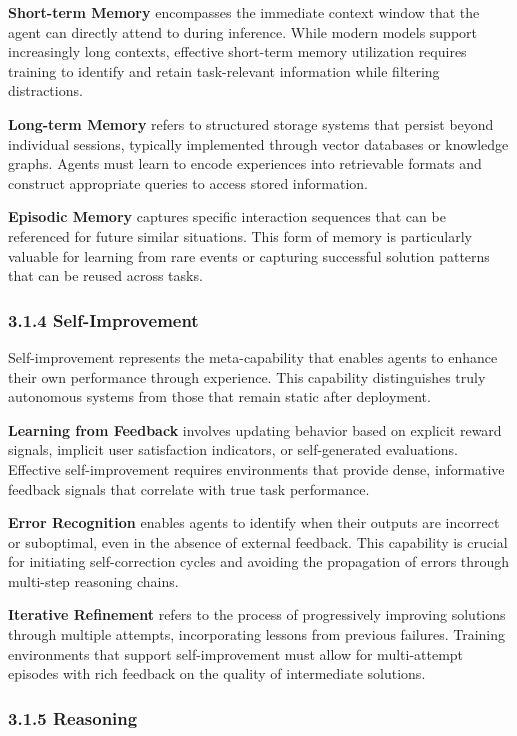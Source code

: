 \textbf{Short-term Memory} encompasses the immediate context window that the agent can directly attend to during inference. While modern models support increasingly long contexts, effective short-term memory utilization requires training to identify and retain task-relevant information while filtering distractions.

\textbf{Long-term Memory} refers to structured storage systems that persist beyond individual sessions, typically implemented through vector databases or knowledge graphs. Agents must learn to encode experiences into retrievable formats and construct appropriate queries to access stored information.

\textbf{Episodic Memory} captures specific interaction sequences that can be referenced for future similar situations. This form of memory is particularly valuable for learning from rare events or capturing successful solution patterns that can be reused across tasks.

\subsubsection{3.1.4 Self-Improvement}

Self-improvement represents the meta-capability that enables agents to enhance their own performance through experience. This capability distinguishes truly autonomous systems from those that remain static after deployment.

\textbf{Learning from Feedback} involves updating behavior based on explicit reward signals, implicit user satisfaction indicators, or self-generated evaluations. Effective self-improvement requires environments that provide dense, informative feedback signals that correlate with true task performance.

\textbf{Error Recognition} enables agents to identify when their outputs are incorrect or suboptimal, even in the absence of external feedback. This capability is crucial for initiating self-correction cycles and avoiding the propagation of errors through multi-step reasoning chains.

\textbf{Iterative Refinement} refers to the process of progressively improving solutions through multiple attempts, incorporating lessons from previous failures. Training environments that support self-improvement must allow for multi-attempt episodes with rich feedback on the quality of intermediate solutions.

\subsubsection{3.1.5 Reasoning}

